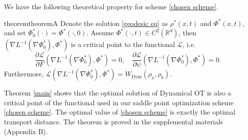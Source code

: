 \documentclass{article}
\begin{document}
We have the following theoretical property for scheme \eqref{chosen scheme}.
\begin{restatable}{theorem}{theoremA}
\label{main}
  Denote the solution \eqref{geodesic eq} as $\rho^*(x,t)$ and $\Phi^*(x,t)$, and set $\Phi_0^*(\cdot) = \Phi^*(\cdot,0)$. Assume $\Phi^*(\cdot, t)\in C^2(\mathbb{R}^d)$, then %
  $(\nabla L^{-1}(\nabla \Phi_0^*), \Phi^*)$ is a critical point to the functional $\mathcal{L}$, i.e.
\[ \frac{\partial \mathcal{L}}{\partial {F}}(\nabla L^{-1}(\nabla \Phi_0^*),\Phi^*) = 0, \quad \frac{\partial \mathcal{L}}{\partial \psi}(\nabla L^{-1}(\nabla \Phi_0^*),\Phi^*) = 0.\]
Furthermore,  $\mathcal{L}(\nabla L^{-1}(\nabla\Phi_0^*), \Phi^*)=W_{\textrm{Dym}}(\rho_a,\rho_b)$.
\end{restatable}
Theorem \ref{main} shows that the optimal solution of Dynamical OT is also a critical point of the functional used in our saddle point optimization scheme \eqref{chosen scheme}. The optimal value of \eqref{chosen scheme} is exactly the optimal transport distance. The theorem is proved in the supplemental materials (Appendix B).
\end{document}
